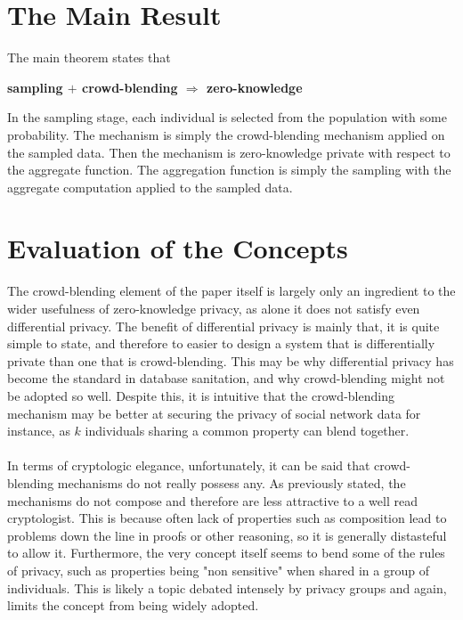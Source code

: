 \documentclass[12pt]{article}
\begin{document}
\section{The Main Result}

The main theorem states that
\begin{center}
\small\textbf{sampling  $+$ crowd-blending  $\Rightarrow$ zero-knowledge }
\end{center}
In the sampling stage, each individual is selected from the population with some probability. The mechanism
is simply the crowd-blending mechanism applied on the sampled data. Then the mechanism
is zero-knowledge private with respect to the aggregate function.
The aggregation function is simply the sampling with the aggregate computation
applied to the sampled data.

\section{Evaluation of the Concepts}
The crowd-blending element of the paper itself is largely
only an ingredient to the wider usefulness of zero-knowledge privacy,
as alone it does not satisfy even differential privacy. The benefit
of differential privacy is mainly that, it is quite simple to state,
and therefore to easier to design a system that is differentially
private than one that is crowd-blending. This may be why differential
privacy has become the standard in database sanitation, and why
crowd-blending might not be adopted so well. Despite this, it is intuitive
that the crowd-blending mechanism may be better at securing
the privacy of social network data for instance, as $k$ individuals
sharing a common property can blend together. \\ \\
In terms of cryptologic elegance, unfortunately, it can be said
that crowd-blending mechanisms do not really possess any. As previously
stated, the mechanisms do not compose and therefore are
less attractive to a well read cryptologist. This is because often
lack of properties such as composition lead to problems down
the line in proofs or other reasoning, so it is generally distasteful
to allow it. Furthermore, the very concept itself seems to bend
some of the rules of privacy, such as properties being "non sensitive"
when shared in a group of individuals. This is likely a topic
debated intensely by privacy groups and again, limits the
concept from being widely adopted. \\
\end{document}
